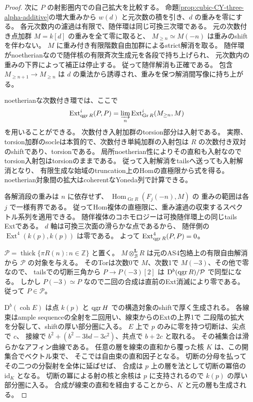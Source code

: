 \begin{proof}
次に $P$ の射影圏内での自己拡大を比較する。
命題\ref{prop:cubic-CY-three-alpha-additive}の増大重みから
$w(d)$ と元次数の積を引き、$d$ の重みを零にする。
各元次数内の濾過は有限で、随伴環は同じ可換三次環である。
元の次数付き点加群 $M=k[d]$ の重みを全て零に取ると、
$M_{\ge n}\simeq M(-n)$ は重みのshiftを伴わない。
$M$ に重み付き有限階数自由加群によるstrict解消を取る。
随伴環がnoetherianなので随伴核の有限斉次生成元を各段で持ち上げられ、
元次数内の重みの下界によって補正は停止する。
従って随伴解消も正確である。
包含 $M_{\ge n+1}\to M_{\ge n}$ は
$d$ の乗法から誘導され、重みを保つ解消間写像に持ち上がる。

noetherianな次数付き環では、ここで
\[
 \operatorname{Ext}^i_{\operatorname{qgr} R}(P,P)
    =\varinjlim_n\operatorname{Ext}^i_{\operatorname{Gr}R}(M_{\ge n},M)
\]
を用いることができる。
次数付き入射加群のtorsion部分は入射である。
実際、torsion加群のsocleは本質的で、次数付き単純加群の入射包は
$R$ の次数付き双対のshiftであり、torsionである。
局所noetherian性によりその直和も入射なのでtorsion入射包はtorsionのままである。
従って入射解消をtailsへ送っても入射解消となり、
有限生成な始域のtruncation上のHomの直極限から式を得る。
noetherian対象間の拡大はcoherentなYoneda列で計算できる。

各解消段の重みは $n$ に依存せず、
$\operatorname{Hom}_{\operatorname{Gr}R}(F_j(-n),M)$ の
重みの範囲は各 $j$ で一様有界である。
従ってHom複体の直極限に、重み濾過の収束するスペクトル系列を適用できる。
随伴複体のコホモロジーは可換随伴環上の同じtails Extである。
$d$ 軸は可換三次面の滑らかな点であるから、
随伴側の $\operatorname{Ext}^4(k(p),k(p))$ は零である。
よって $\operatorname{Ext}^4_{\operatorname{qgr} R}(P,P)=0$。

$\mathcal P=\operatorname{thick}\{\pi R(n):n\in\mathbb Z\}$ と置く。
$M\otimes^\mathbf L_{\mathcal B} R$ は元のAS4包絡上の有限自由解消から
$\mathcal P$ の対象を与える。
そのTorは次数0で $M$、次数1で $M(-3)$、その他で零なので、
tailsでの切断三角から
$P\to P(-3)[2]$ は $\mathrm D^b(\operatorname{qgr} R)/\mathcal P$ で同型になる。
しかし $P(-3)\simeq P$ なので二回の合成は直前のExt消滅により零である。
従って $P\in\mathcal P$。

$\mathrm D^b(\operatorname{coh}E)$ は点 $k(p)$ と
$\operatorname{qgr} H$ での構造対象のshiftで厚く生成される。
各線束はample sequenceの全射を二回用い、線束からのExtの上界1で
二段階の拡大を分裂して、shiftの厚い部分圏に入る。
$E$ 上で $p$ のみに零を持つ切断は、尖点で $c$、
接線で $b^2+(b^2-3bd-3c^2)$、共点で $b+2c$ と取れる。
その補集合は滑らかなアフィン曲線である。
任意の層を線束の直和から覆った核 $K$ は、この開集合でベクトル束で、
そこでは自由束の直和因子となる。
切断の分母を払ってその二つの分裂射を全体に延ばせば、
合成は $p$ 上の層を法として切断の冪倍の $\mathrm{id}_K$ となる。
切断の冪による射の核と余核は $p$ に支持されるので
$k(p)$ の厚い部分圏に入る。
合成が線束の直和を経由することから、$K$ と元の層も生成される。


\end{proof}
